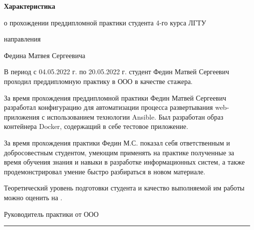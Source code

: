 \documentclass{gost}
\begin{document}
  \begin{center}
    {\bfseries Характеристика}

    о прохождении преддипломной практики студента 4-го курса ЛГТУ

    направления


    Федина Матвея Сергеевича
  \\[\baselineskip]
  \end{center}

  В период с 04.05.2022 г. по 20.05.2022 г. студент Федин Матвей Сергеевич
  проходил преддипломную практику в ООО  в качестве
  стажера.

  За время прохождения преддипломной практики Федин Матвей Сергеевич разработал
  конфигурацию для автоматизации процесса развертывания web-приложения
  с использованием технологии Ansible. Был разработан образ контейнера Docker,
  содержащий в себе тестовое приложение.

  За время прохождения практики Федин М.С. показал себя ответственным и
  добросовестным студентом, умеющим применять на практике полученные за время
  обучения знания и навыки в разработке информационных систем, а также
  продемонстрировал умение быстро разбираться в новом материале.

  Теоретический уровень подготовки студента и качество выполняемой им работы
  можно оценить на .

  \vfill
  \noindent
  Руководитель практики от ООО \\[\baselineskip]
  \rule{10cm}{1pt}

  \thispagestyle{empty}
\end{document}
